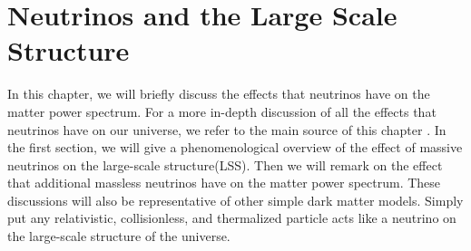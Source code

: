 \documentclass[../main.tex]{subfiles}
\begin{document}
\chapter{Neutrinos and the Large Scale Structure}
In this chapter, we will briefly discuss the effects that neutrinos have on the matter power spectrum. For a more in-depth discussion of all the effects that neutrinos have on our universe, we refer to the main source of this chapter \cite{lesgourgues_mangano_miele_pastor_2013}. In the first section, we will give a phenomenological overview of the effect of massive neutrinos on the large-scale structure(LSS). Then we will remark on the effect that additional massless neutrinos have on the matter power spectrum. These discussions will also be representative of other simple dark matter models. Simply put any relativistic, collisionless, and thermalized particle acts like a neutrino on the large-scale structure of the universe.
\end{document}
